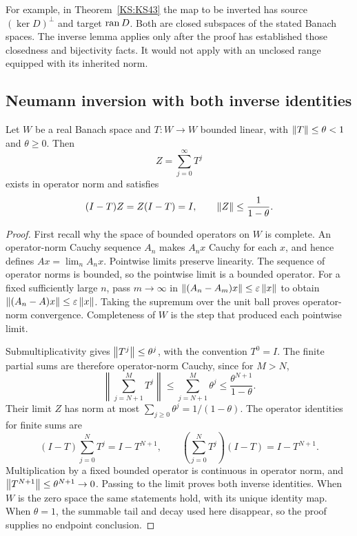 \documentclass[11pt,oneside,openany]{book}
\numberwithin{equation}{section}
\begin{document}
For example, in Theorem~\ref{KS:KS43} the map to be inverted has source \((\ker D)^\perp\) and target \(\operatorname{ran} D\). Both are closed subspaces of the stated Banach spaces. The inverse lemma applies only after the proof has established those closedness and bijectivity facts. It would not apply with an unclosed range equipped with its inherited norm.

\subsection{Neumann inversion with both inverse identities}
\begin{KSlemma}\label{KS:lem:neumann-tool}
Let \(W\) be a real Banach space and \(T:W\to W\) bounded linear, with \(\left\lVert T\right\rVert\le\theta<1\) and \(\theta\ge0\). Then
\[
 Z=\sum_{j=0}^{\infty}T^j
\]
exists in operator norm and satisfies
\[
 (I-T)Z=Z(I-T)=I,\qquad \left\lVert Z\right\rVert\le\frac1{1-\theta}.
\]
\end{KSlemma}
\begin{proof}
First recall why the space of bounded operators on \(W\) is complete. An operator-norm Cauchy sequence \(A_n\) makes \(A_nx\) Cauchy for each \(x\), and hence defines \(Ax=\lim_nA_nx\). Pointwise limits preserve linearity. The sequence of operator norms is bounded, so the pointwise limit is a bounded operator. For a fixed sufficiently large \(n\), pass \(m\to\infty\) in \(\left\lVert(A_n-A_m)x\right\rVert\le\varepsilon\left\lVert x\right\rVert\) to obtain \(\left\lVert(A_n-A)x\right\rVert\le\varepsilon\left\lVert x\right\rVert\). Taking the supremum over the unit ball proves operator-norm convergence. Completeness of \(W\) is the step that produced each pointwise limit.

Submultiplicativity gives \(\left\lVert T^j\right\rVert\le\theta^j\), with the convention \(T^0=I\). The finite partial sums are therefore operator-norm Cauchy, since for \(M>N\),
\[
 \left\|\sum_{j=N+1}^{M}T^j\right\|
 \le\sum_{j=N+1}^{M}\theta^j\le\frac{\theta^{N+1}}{1-\theta}.
\]
Their limit \(Z\) has norm at most \(\sum_{j\ge0}\theta^j=1/(1-\theta)\). The operator identities for finite sums are
\[
 (I-T)\sum_{j=0}^{N}T^j=I-T^{N+1},\qquad
 \left(\sum_{j=0}^{N}T^j\right)(I-T)=I-T^{N+1}.
\]
Multiplication by a fixed bounded operator is continuous in operator norm, and \(\left\lVert T^{N+1}\right\rVert\le\theta^{N+1}\to0\). Passing to the limit proves both inverse identities. When \(W\) is the zero space the same statements hold, with its unique identity map. When \(\theta=1\), the summable tail and decay used here disappear, so the proof supplies no endpoint conclusion.
\end{proof}
\end{document}
